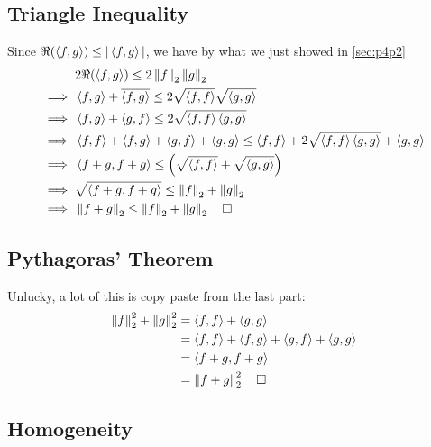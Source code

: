 \documentclass[12pt]{article}
\newcommand{\norm}[1]{\left\lVert#1\right\rVert}
\begin{document}
\pagebreak

\subsection{Triangle Inequality}

Since $\Re(\braket{f, g}) \le |\braket{f, g}|$, we have by what we just showed in \ref{sec:p4p2}
\begin{align*}
             & 2\Re(\braket{f, g}) \le 2\norm{f}_2\norm{g}_2                                          \\
  \implies{} & \braket{f, g} + \overline{\braket{f, g}} \le 2\sqrt{\braket{f, f}}\sqrt{\braket{g, g}} \\
  \implies{} & \braket{f, g} + \braket{g, f} \le 2\sqrt{\braket{f, f}\braket{g, g}}                   \\
  \implies{} & \braket{f, f} + \braket{f, g} + \braket{g, f} + \braket{g, g}
  \le \braket{f, f} + 2\sqrt{\braket{f, f}\braket{g, g}} + \braket{g, g}                              \\
  \implies{} & \braket{f + g, f + g} \le \left(\sqrt{\braket{f, f}} + \sqrt{\braket{g, g}}\right)     \\
  \implies{} & \sqrt{\braket{f + g, f + g}} \le \norm{f}_2 + \norm{g}_2                               \\
  \implies{} & \norm{f+g}_2 \le \norm{f}_2+\norm{g}_2\quad\square
\end{align*}

\subsection{Pythagoras' Theorem}

Unlucky, a lot of this is copy paste from the last part:
\begin{align*}
  \norm{f}_2^2 + \norm{g}_2^2
   & = \braket{f, f} + \braket{g, g}                                 \\
   & = \braket{f, f} + \braket{f, g} + \braket{g, f} + \braket{g, g} \\
   & = \braket{f + g, f + g}                                         \\
   & = \norm{f+g}_2^2\quad\square
\end{align*}

\subsection{Homogeneity}
\end{document}
